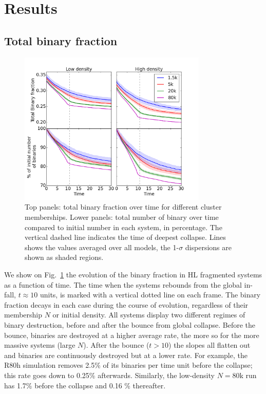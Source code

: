 \section{Results}


\subsection{Total binary fraction}



\begin{figure}
\begin{center}
\includegraphics[width=0.8\textwidth]{Figures/6_TotBinFrac_vs_time_dispersion}
\caption{ Top panels: total binary fraction over time for different cluster memberships. Lower panels: total number of binary over time compared to initial number in each system, in percentage. The vertical dashed line indicates the time of deepest collapse. Lines shows the values averaged over all models, the 1-$\sigma$ dispersions are shown as shaded regions. }
\label{Fig:6_TotBinFrac}
\end{center}
\end{figure}

We show on Fig.~\ref{Fig:6_TotBinFrac} the evolution of the binary fraction in HL fragmented systems as a function of time. The time when the systems rebounds from the global in-fall, $t \approx 10$ units, is marked with a vertical dotted line on each frame. The binary fraction decays in each case during the course of evolution, regardless of their membership $N$ or initial density. 
All systems display two different regimes of binary destruction, before and after the bounce from global collapse. Before the bounce, binaries are destroyed at a higher average rate, the more so for the more massive systems (large $N$). 
After the bounce ($t > 10$) the slopes all flatten out and binaries are continuously destroyed but at a lower rate. For example, the R80h simulation removes 2.5\% of its binaries per time unit before the collapse; this rate goes down to 0.25\% afterwards. Similarly, the low-density $N = 80$k run has  1.7\% before the collapse and 0.16 \% thereafter.


